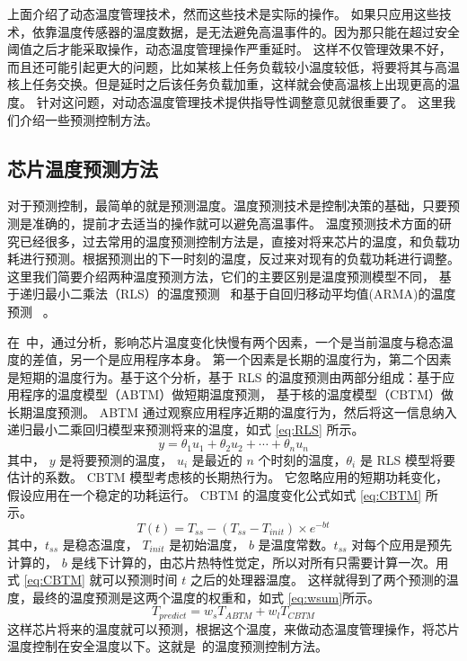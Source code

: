 上面介绍了动态温度管理技术，然而这些技术是实际的操作。
如果只应用这些技术，依靠温度传感器的温度数据，是无法避免高温事件的。因为那只能在超过安全阈值之后才能采取操作，动态温度管理操作严重延时。
这样不仅管理效果不好，而且还可能引起更大的问题，比如某核上任务负载较小温度较低，将要将其与高温核上任务交换。但是延时之后该任务负载加重，这样就会使高温核上出现更高的温度。
针对这问题，对动态温度管理技术提供指导性调整意见就很重要了。
这里我们介绍一些预测控制方法。
\subsection{芯片温度预测方法}\label{sec:temperature}
对于预测控制，最简单的就是预测温度。温度预测技术是控制决策的基础，只要预测是准确的，提前才去适当的操作就可以避免高温事件。
温度预测技术方面的研究已经很多，过去常用的温度预测控制方法是，直接对将来芯片的温度，和负载功耗进行预测。根据预测出的下一时刻的温度，反过来对现有的负载功耗进行调整。
这里我们简要介绍两种温度预测方法，它们的主要区别是温度预测模型不同，
基于递归最小二乘法（RLS）的温度预测~\cite{yeo2008predictive} 和基于自回归移动平均值(ARMA)的温度预测~\cite{coskun2008proactive} 。

在~\cite{yeo2008predictive}中，通过分析，影响芯片温度变化快慢有两个因素，一个是当前温度与稳态温度的差值，另一个是应用程序本身。
第一个因素是长期的温度行为，第二个因素是短期的温度行为。基于这个分析，基于 RLS 的温度预测由两部分组成：基于应用程序的温度模型（ABTM）做短期温度预测，
基于核的温度模型（CBTM）做长期温度预测。 ABTM 通过观察应用程序近期的温度行为，然后将这一信息纳入递归最小二乘回归模型来预测将来的温度，如式 \eqref{eq:RLS} 所示。
\begin{equation}\label{eq:RLS}
y = \theta_1u_1 + \theta_2u_2 + \cdots + \theta_nu_n
\end{equation}
其中， $y$ 是将要预测的温度， $u_i$ 是最近的 $n$ 个时刻的温度，$\theta_i$ 是 RLS 模型将要估计的系数。 CBTM 模型考虑核的长期热行为。
它忽略应用的短期功耗变化，假设应用在一个稳定的功耗运行。 CBTM 的温度变化公式如式 \eqref{eq:CBTM} 所示。
\begin{equation}\label{eq:CBTM}
T(t) = T_{ss} -(T_{ss} - T_{init}) \times e^{-bt}
\end{equation}
其中，$t_{ss}$ 是稳态温度， $T_{init}$ 是初始温度， $b$ 是温度常数。$t_{ss}$ 对每个应用是预先计算的，  
$b$ 是线下计算的，由芯片热特性觉定，所以对所有只需要计算一次。用式 \eqref{eq:CBTM} 就可以预测时间 $t$ 之后的处理器温度。
这样就得到了两个预测的温度，最终的温度预测是这两个温度的权重和，如式 \eqref{eq:wsum}所示。
\begin{equation}\label{eq:wsum}
T_{predict} = w_sT_{ABTM} + w_lT_{CBTM}
\end{equation}
这样芯片将来的温度就可以预测，根据这个温度，来做动态温度管理操作，将芯片温度控制在安全温度以下。这就是~\cite{yeo2008predictive}的温度预测控制方法。

